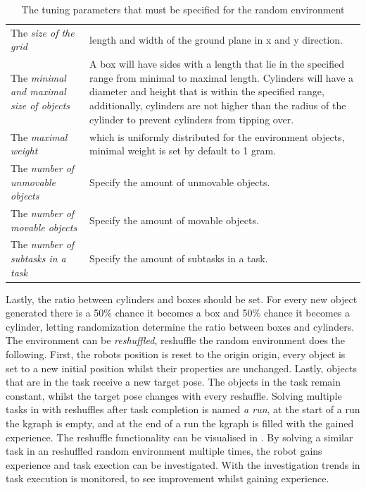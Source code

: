 \noindent
\begin{table}[H]
\centering
\begin{tabular}%
{>{\raggedright\arraybackslash}p{}%
>{\raggedright\arraybackslash}p{}}
The \textit{size of the grid} & length and width of the ground plane in \gls{x} and \gls{y} direction.\\
The \textit{minimal and maximal size of objects} & A box will have sides with a length that lie in the specified range from minimal to maximal length. Cylinders will have a diameter and height that is within the specified range, additionally, cylinders are not higher than the radius of the cylinder to prevent cylinders from tipping over. \\
The \textit{maximal weight} & which is uniformly distributed for the environment objects, minimal weight is set by default to 1 gram. \\
The \textit{number of unmovable objects} & Specify the amount of unmovable objects.\\
The \textit{number of movable objects} & Specify the amount of movable objects.\\
The \textit{number of subtasks in a task} & Specify the amount of subtasks in a task.
\end{tabular}
\caption{The tuning parameters that must be specified for the random environment}%
\label{table:configure_rand_env}
\end{table}

Lastly, the ratio between cylinders and boxes should be set. For every new object generated there is a 50\% chance it becomes a box and 50\% chance it becomes a cylinder, letting randomization determine the ratio between boxes and cylinders. \\

The environment can be \textit{reshuffled}, reshuffle the random environment does the following. First, the robots position is reset to the origin \gls{origin}, every object is set to a new initial position whilst their properties are unchanged. Lastly, objects that are in the task receive a new target pose. The objects in the task remain constant, whilst the target pose changes with every reshuffle. Solving multiple tasks in with reshuffles after task completion is named \textit{a run}, at the start of a run the \ac{kgraph} is empty, and at the end of a run the \ac{kgraph} is filled with the gained experience. The reshuffle functionality can be visualised in . By solving a similar task in an reshuffled random environment multiple times, the robot gains experience and task exection can be investigated. With the investigation trends in task execution is monitored, to see improvement whilst gaining experience.\bs

